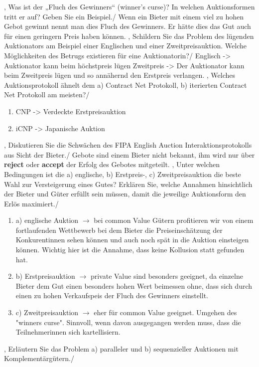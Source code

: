 \documentclass[11pt]{article}
\begin{document}
{{},
%
{Was ist der „Fluch des Gewinners“ (winner’s curse)? In welchen Auktionsformen tritt er auf? Geben Sie ein Beispiel.}/
{
    Wenn ein Bieter mit einem viel zu hohen Gebot gewinnt nennt man dies Fluch des Gewinners. Er hätte dies das Gut auch für einen geringern Preis haben können.
},
%
{Schildern Sie das Problem des lügenden Auktionators am Beispiel einer Englischen und einer Zweitpreisauktion. Welche Möglichkeiten des Betrugs existieren für eine Auktionatorin?}/
{
    Englisch -> Auktionator kann beim höchstpreis lügen
    Zweitpreis -> Der Auktionator kann beim Zweitpreis lügen und so annähernd den Erstpreis verlangen.
},
%
{Welches Auktionsprotokoll ähnelt dem a) Contract Net Protokoll, b) iterierten Contract Net Protokoll am meisten?}/
{
    \begin{enumerate}
        \item CNP -> Verdeckte Erstpreisauktion
        \item iCNP -> Japanische Auktion
    \end{enumerate}
},
%
{Diskutieren Sie die Schwächen des FIPA English Auction Interaktionsprotokolls aus Sicht der Bieter.}/
{
    Gebote sind einem Bieter nicht bekannt, ihm wird nur über \textbf{reject} oder \textbf{accept} der Erfolg des Gebotes mitgeteilt.
},
%
{Unter welchen Bedingungen ist die a) englische, b) Erstpreis-, c) Zweitpreisauktion die beste Wahl zur Versteigerung eines Gutes? Erklären Sie, welche Annahmen hinsichtlich der Bieter und Güter erfüllt sein müssen, damit die jeweilige Auktionsform den Erlös maximiert.}/
{
    \begin{enumerate}
        \item a) englische Auktion $\to$ bei common Value Gütern profitieren wir von einem fortlaufenden Wettbewerb bei dem Bieter die Preiseinschätzung der Konkurentinnen sehen können und auch noch spät in die Auktion einsteigen können. Wichtig hier ist die Annahme, dass keine Kollusion statt gefunden hat.
        \item b) Erstpreisauktion $\to$ private Value sind besonders geeignet, da einzelne Bieter dem Gut einen besonders hohen Wert beimessen ohne, dass sich durch einen zu hohen Verkaufspeis der Fluch des Gewinners einstellt.
        \item c) Zweitpreisauktion $\to$ eher für common Value geeignet. Umgehen des "winners curse". Sinnvoll, wenn davon ausgegangen werden muss, dass die Teilnehmerinnen sich kartellisiern.
    \end{enumerate}
},
%
{Erläutern Sie das Problem a) paralleler und b) sequenzieller Auktionen mit Komplementärgütern.}/
}
\end{document}
